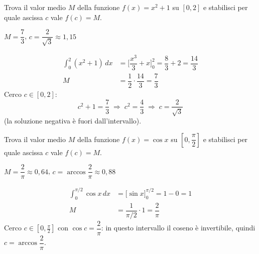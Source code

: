 
\begin{question}[ID=3.3, subtitle={Valor medio di $x^2+1$ su $[0,2]$}, tags={integrali, valor medio}, difficulty=media]
Trova il valor medio $M$ della funzione $f(x) = x^2 + 1$ su $[0, 2]$ e stabilisci per quale ascissa $c$ vale $f(c) = M$.
\begin{solution}
$M=\dfrac73$, \quad $c=\dfrac{2}{\sqrt3}\approx1{,}15$
\end{solution}
\begin{explanation}
\[\begin{aligned}
\int_0^2(x^2+1)\,dx &= \Big[\dfrac{x^3}{3}+x\Big]_0^2=\dfrac83+2=\dfrac{14}{3}\\
M &= \dfrac12\cdot\dfrac{14}{3}=\dfrac73
\end{aligned}\]
Cerco $c\in[0,2]$:
\[ c^2+1=\dfrac73 \;\Rightarrow\; c^2=\dfrac43 \;\Rightarrow\; c=\dfrac{2}{\sqrt3} \]
(la soluzione negativa è fuori dall'intervallo).
\end{explanation}
\end{question}


\begin{question}[ID=3.4, subtitle={Valor medio di $\cos x$ su $[0,\pi/2]$}, tags={integrali, valor medio}, difficulty=media]
Trova il valor medio $M$ della funzione $f(x) = \cos x$ su $[0, \dfrac{\pi}{2}]$ e stabilisci per quale ascissa $c$ vale $f(c) = M$.
\begin{solution}
$M=\dfrac2\pi\approx0{,}64$, \quad $c=\arccos\dfrac2\pi\approx0{,}88$
\end{solution}
\begin{explanation}
\[\begin{aligned}
\int_0^{\pi/2}\cos x\,dx &= \Big[\sin x\Big]_0^{\pi/2}=1-0=1\\
M &= \dfrac{1}{\pi/2}\cdot1=\dfrac2\pi
\end{aligned}\]
Cerco $c\in\left[0,\tfrac\pi2\right]$ con $\cos c=\dfrac2\pi$: in questo intervallo il coseno è invertibile, quindi $c=\arccos\dfrac2\pi$.
\end{explanation}
\end{question}


